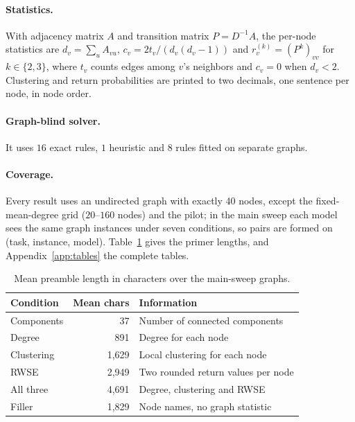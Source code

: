 \documentclass[11pt]{article}
\begin{document}
\paragraph{Statistics.} With adjacency matrix $A$ and transition matrix $P=D^{-1}A$, the per-node statistics are $d_v=\sum_u A_{vu}$, $c_v=2t_v/(d_v(d_v-1))$ and $r_v^{(k)}=(P^k)_{vv}$ for $k\in\{2,3\}$, where $t_v$ counts edges among $v$'s neighbors and $c_v=0$ when $d_v<2$. Clustering and return probabilities are printed to two decimals, one sentence per node, in node order.

\paragraph{Graph-blind solver.} It uses $16$ exact rules, $1$ heuristic and $8$ rules fitted on separate graphs. %



\paragraph{Coverage.} Every result uses an undirected graph with exactly 40 nodes, except the fixed-mean-degree grid ($20$--$160$ nodes) and the pilot; in the main sweep each model sees the same graph instances under seven conditions, so pairs are formed on (task, instance, model). %
Table~\ref{tab:primerlength} gives the primer lengths, and Appendix~\ref{app:tables} the complete tables.

\begin{table}[h]
\centering\footnotesize
\setlength{\tabcolsep}{4pt}
\begin{tabular}{lrp{3.1cm}}
\toprule
Condition & Mean chars & Information\\
\midrule
Components & 37 & Number of connected components\\ %
Degree & 891 & Degree for each node\\ %
Clustering & 1,629 & Local clustering for each node\\ %
RWSE & 2,949 & Two rounded return values per node\\ %
All three & 4,691 & Degree, clustering and RWSE\\ %
Filler & 1,829 & Node names, no graph statistic\\ %
\bottomrule
\end{tabular}
\caption{Mean preamble length in characters over the main-sweep graphs.} %
\label{tab:primerlength}
\end{table}
\end{document}
